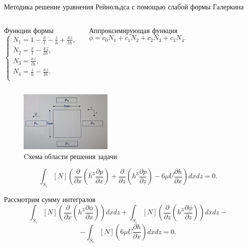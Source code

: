 \documentclass[ignoreonframetext,unicode]{beamer}
\begin{document}
\begin{frame}{Методика решение уравнения Рейнольдса с помощью слабой формы Галеркина}
	
\begin{columns}
		
	\begin{block}{Функции формы}
		\[
			\begin{cases}
				N_1 = 1 - \frac{x}{l} - \frac{z}{h} + \frac{x  z}{l  h}, \\
				N_2 = \frac{x}{l} - \frac{x  z}{l  h}, \\
				N_3 = \frac{x  z}{l h}, \\
				N_4 = \frac{z}{h} - \frac{x  z}{l  h}. \\
			\end{cases}
			\label{form-func}
		\]
		\end{block}
	
	\begin{block}{Аппроксимирующая функция}
		\[
			\phi = c_0 N_1 + c_1 N_2 + c_2 N_3 + c_3 N_4.
		\]
	\end{block}

\end{columns}

\begin{figure}[!htbp]
	\centering
	\includegraphics[width=0.4\textwidth]{taskGU}%
	\caption{Cхема области решения задачи}
	\vspace*{-2mm}
	\label{ser_graph}
\end{figure}
	
\end{frame}

\begin{frame}{}
	\begin{block}{}
	\[
	\int_{S_i} {[N] \left(\frac{\partial}{\partial x} \left(h^3 \frac{\partial p}{\partial x} \right) + \frac{\partial}{\partial z} \left(h^3 \frac{\partial p}{\partial z} \right) - 6 \mu U \frac{\partial h}{\partial x}\right) dx dz} = 0.
	\]
	\end{block}

\begin{block}{Рассмотрим сумму интегралов}
	\[
		\int_{S_i} {[N] \left(\frac{\partial}{\partial x} \left(h^3 \frac{\partial \phi}{\partial x} \right)\right) dx dz}
	+
	\int_{S_i} {[N] \left(\frac{\partial}{\partial z} \left(h^3 \frac{\partial \phi}{\partial z} \right)\right) dx dz} 
	-\]
	\[ -
	\int_{S_i} [N]\left(6 \mu U \frac{\partial h}{\partial x}\right) dx dz = 0.
	\]
\end{block}
	
	
\end{frame}
\end{document}
